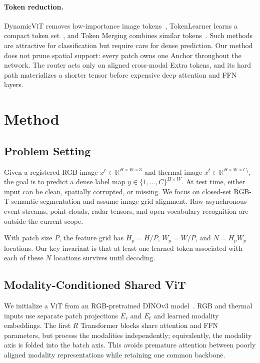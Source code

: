 \documentclass[10pt,twocolumn,letterpaper]{article}
\newcommand{\R}{\mathbb{R}}
\begin{document}
\paragraph{Token reduction.}
DynamicViT removes low-importance image tokens~\cite{rao2021dynamicvit}, TokenLearner learns a compact token set~\cite{ryoo2021tokenlearner}, and Token Merging combines similar tokens~\cite{bolya2023tome}.
Such methods are attractive for classification but require care for dense prediction.
Our method does not prune spatial support: every patch owns one Anchor throughout the network.
The router acts only on aligned cross-modal Extra tokens, and its hard path materializes a shorter tensor before expensive deep attention and FFN layers.

\section{Method}
\label{sec:method}

\subsection{Problem Setting}

Given a registered RGB image $x^r\in\R^{H\times W\times3}$ and thermal image $x^t\in\R^{H\times W\times C_t}$, the goal is to predict a dense label map $y\in\{1,\ldots,C\}^{H\times W}$.
At test time, either input can be clean, spatially corrupted, or missing.
We focus on closed-set RGB-T semantic segmentation and assume image-grid alignment.
Raw asynchronous event streams, point clouds, radar tensors, and open-vocabulary recognition are outside the current scope.

With patch size $P$, the feature grid has $H_p=H/P$, $W_p=W/P$, and $N=H_pW_p$ locations.
Our key invariant is that at least one learned token associated with each of these $N$ locations survives until decoding.

\subsection{Modality-Conditioned Shared ViT}
\label{sec:sharedvit}

We initialize a ViT from an RGB-pretrained DINOv3 model~\cite{simeoni2025dinov3}.
RGB and thermal inputs use separate patch projections $E_r$ and $E_t$ and learned modality embeddings.
The first $R$ Transformer blocks share attention and FFN parameters, but process the modalities independently; equivalently, the modality axis is folded into the batch axis.
This avoids premature attention between poorly aligned modality representations while retaining one common backbone.
\end{document}
